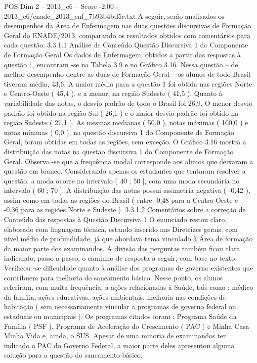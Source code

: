 \begin{textsample}{POS Dim 2 – 2013\_c6 – Score -2.00 – 2013\_c6/enade\_2013\_enf\_7b93b4bd5c.txt}
A seguir, serão analisados os desempenhos da Área de Enfermagem nas duas questões discursivas de Formação Geral do ENADE/2013, comparando os resultados obtidos com comentários para cada questão. 3.3.1.1 Análise de Conteúdo Questão Discursiva 1 do Componente de Formação Geral Os dados de Enfermagem, obtidos a partir das respostas à questão 1, encontram -se na Tabela 3.9 e no Gráfico 3.16.
Nessa questão – de melhor desempenho dentre as duas de Formação Geral – os alunos de todo Brasil tiveram média, 43,6.
A maior média para a questão 1 foi obtida nas regiões Norte e Centro-Oeste ( 45,4 ), e a menor, na região Sudeste ( 41,5 ).
Quanto à variabilidade das notas, o desvio padrão de todo o Brasil foi 26,9.
O menor desvio padrão foi obtido na região Sul ( 26,1 ) e o maior desvio padrão foi obtido na região Sudeste ( 27,1 ).
As mesmas medianas ( 50,0 ), notas máximas ( 100,0 ) e notas mínimas ( 0,0 ), na questão discursiva 1 do Componente de Formação Geral, foram obtidas em todas as regiões, sem exceção.
O Gráfico 3.16 mostra a distribuição das notas na questão discursiva 1 do Componente de Formação Geral.
Observa -se que a frequência modal corresponde aos alunos que deixaram a questão em branco.
Considerando apenas os estudantes que tentaram resolver a questão, a moda ocorre no intervalo ( 40 ; 50 ], com uma moda secundária no intervalo ( 60 ; 70 ].
A distribuição das notas possui assimetria negativa ( -0,42 ), assim como em todas as regiões do Brasil ( entre -0,48 para a Centro-Oeste e -0,36 para as regiões Norte e Sudeste ). 3.3.1.2 Comentários sobre a correção de Conteúdo das respostas à Questão Discursiva 1 O enunciado restou claro, elaborado com linguagem técnica, estando inserido nas Diretrizes gerais, com nível médio de profundidade, já que abordava tema vinculado à Área de formação da maior parte dos examinandos.
A divisão das perguntas também ficou clara indicando, passo a passo, o caminho de resposta a seguir, com base no texto.
Verificou -se dificuldade quanto à análise dos programas de governo existentes que contribuem para melhoria do saneamento básico.
Nesse ponto, os alunos referiram, com muita frequência, a ações relacionadas à Saúde, tais como : médico da família, ações educativas, ações ambientais, melhoria nas condições de habitação ( sem necessariamente vincular a programas de governo federal ou estaduais ou municipais ).
Os programas citados foram : Programa Saúde da Família ( PSF ), Programa de Aceleração do Crescimento ( PAC ) e Minha Casa Minha Vida e, ainda, o SUS.
Apesar de uma minoria de examinandos ter indicado o PAC do Governo Federal, a maior parte deles apresentou alguma solução para a questão do saneamento básico.

\end{textsample}
